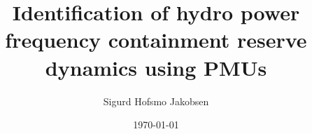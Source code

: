 \title{Identification of hydro power frequency containment reserve dynamics using PMUs}
\author{Sigurd Hofsmo Jakobsen}
\date{\today}

\begin{frame}
  \titlepage
\end{frame}
